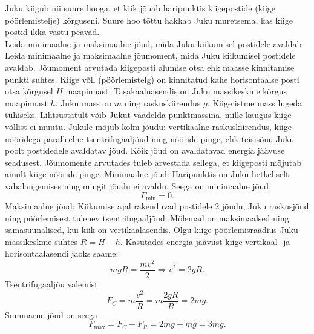 
Juku kiigub  nii suure hooga, et kiik jõuab haripunktis kiigepostide (kiige pöörlemistelje) kõrguseni. Suure hoo tõttu hakkab Juku muretsema, kas kiige postid ikka vastu peavad.\\
\osa Leida minimaalne ja maksimaalne jõud, mida Juku kiikumisel postidele avaldab.\\
\osa Leida minimaalne ja maksimaalne jõumoment, mida Juku kiikumisel postidele avaldab. Jõumoment arvutada kiigeposti alumise otsa ehk maasse kinnitamise punkti suhtes.
Kiige võll (pöörlemistelg) on kinnitatud kahe horisontaalse posti otsa kõrgusel $H$ maapinnast. Tasakaaluasendis on Juku massikeskme kõrgus maapinnast $h$. Juku mass on $m$ ning raskuskiirendus $g$. Kiige istme mass lugeda tühiseks. Lihtsustatult võib Jukut vaadelda punktmassina, mille kaugus kiige võllist ei muutu.\hint
Jukule mõjub kolm jõudu: vertikaalne raskuskiirendus, kiige nööridega paralleelne tsentrifugaaljõud ning nööride pinge, ehk teisisõnu Juku poolt postidedele avaldatav jõud. Kõik jõud on avaldatavad energia jäävuse seadusest. Jõumomente arvutades tuleb arvestada sellega, et kiigeposti mõjutab ainult kiige nööride pinge.\solu
\osa Minimaalne jõud: Haripunktis on Juku hetkeliselt vabalangemises ning mingit jõudu ei avaldu. Seega on minimaalne jõud: 
$$F_\mathrm{min} = 0.$$ 
Maksimaalne jõud: Kiikumise ajal rakenduvad postidele 2 jõudu, Juku raskusjõud ning pöörlemisest tulenev tsentrifugaaljõud. Mõlemad on maksimaalsed ning samasuunalised, kui kiik on vertikaalasendis. Olgu kiige pöörlemisraadius Juku massikeskme suhtes $R = H-h$. Kasutades energia jäävust kiige vertikaal- ja horisontaalasendi jaoks saame: 
$$mgR = \frac{mv^2}{2} \Rightarrow v^2 = 2gR.$$ 
Tsentrifugaaljõu valemist
$$F_C = m\frac{v^2}{R} = m\frac{2gR}{R} = 2mg.$$
Summarne jõud on seega
$$F_\mathrm{max} = F_C + F_R = 2mg + mg = 3mg.$$

